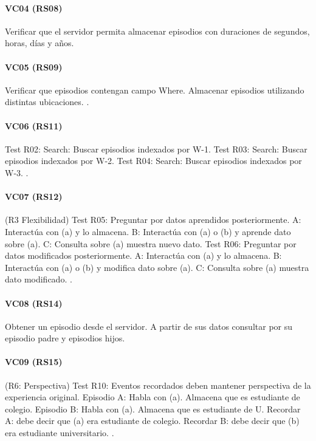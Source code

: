 \paragraph{VC04 (RS08)}
Verificar que el servidor permita almacenar episodios con duraciones de segundos, horas, días y años.

\paragraph{VC05 (RS09)}
Verificar que episodios contengan campo Where. Almacenar episodios utilizando distintas ubicaciones.
.


\paragraph{VC06 (RS11)}
Test R02: Search: Buscar episodios indexados por W-1.
Test R03: Search: Buscar episodios indexados por W-2.
Test R04: Search: Buscar episodios indexados por W-3.
.


\paragraph{VC07 (RS12)}
(R3 Flexibilidad)
Test R05: Preguntar por datos aprendidos posteriormente.
A: Interactúa con (a) y lo almacena.
B: Interactúa con (a) o (b) y aprende dato sobre (a).
C: Consulta sobre (a) muestra nuevo dato.
Test R06: Preguntar por datos modificados posteriormente.
A: Interactúa con (a) y lo almacena.
B: Interactúa con (a) o (b) y modifica dato sobre (a).
C: Consulta sobre (a) muestra dato modificado.
.

\paragraph{VC08 (RS14)}
Obtener un episodio desde el servidor. A partir de sus datos consultar por su episodio padre y episodios hijos.

\paragraph{VC09 (RS15)}
(R6: Perspectiva)
Test R10: Eventos recordados deben mantener perspectiva de la experiencia original.
Episodio A: Habla con (a). Almacena que es estudiante de colegio.
Episodio B: Habla con (a). Almacena que es estudiante de U.
Recordar A: debe decir que (a) era estudiante de colegio.
Recordar B: debe decir que (b) era estudiante universitario. 
.

